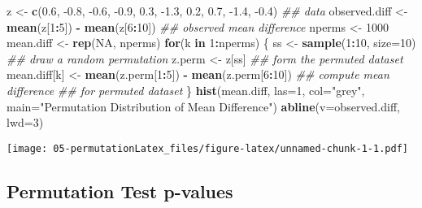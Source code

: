 \documentclass[]{book}
\newenvironment{Shaded}{\begin{snugshade}}{\end{snugshade}}
\newcommand{\CommentTok}[1]{\textcolor[rgb]{0.56,0.35,0.01}{\textit{#1}}}
\newcommand{\ControlFlowTok}[1]{\textcolor[rgb]{0.13,0.29,0.53}{\textbf{#1}}}
\newcommand{\DataTypeTok}[1]{\textcolor[rgb]{0.13,0.29,0.53}{#1}}
\newcommand{\DecValTok}[1]{\textcolor[rgb]{0.00,0.00,0.81}{#1}}
\newcommand{\FloatTok}[1]{\textcolor[rgb]{0.00,0.00,0.81}{#1}}
\newcommand{\KeywordTok}[1]{\textcolor[rgb]{0.13,0.29,0.53}{\textbf{#1}}}
\newcommand{\NormalTok}[1]{#1}
\newcommand{\OperatorTok}[1]{\textcolor[rgb]{0.81,0.36,0.00}{\textbf{#1}}}
\newcommand{\OtherTok}[1]{\textcolor[rgb]{0.56,0.35,0.01}{#1}}
\newcommand{\StringTok}[1]{\textcolor[rgb]{0.31,0.60,0.02}{#1}}
\begin{document}
\begin{Shaded}
\begin{Highlighting}[]
\NormalTok{z <-}\StringTok{ }\KeywordTok{c}\NormalTok{(}\FloatTok{0.6}\NormalTok{, }\FloatTok{-0.8}\NormalTok{, }\FloatTok{-0.6}\NormalTok{, }\FloatTok{-0.9}\NormalTok{, }\FloatTok{0.3}\NormalTok{, }\FloatTok{-1.3}\NormalTok{, }\FloatTok{0.2}\NormalTok{, }\FloatTok{0.7}\NormalTok{, }\FloatTok{-1.4}\NormalTok{, }\FloatTok{-0.4}\NormalTok{) }\CommentTok{## data}
\NormalTok{observed.diff <-}\StringTok{ }\KeywordTok{mean}\NormalTok{(z[}\DecValTok{1}\OperatorTok{:}\DecValTok{5}\NormalTok{]) }\OperatorTok{-}\StringTok{ }\KeywordTok{mean}\NormalTok{(z[}\DecValTok{6}\OperatorTok{:}\DecValTok{10}\NormalTok{])  }\CommentTok{## observed mean difference}
\NormalTok{nperms <-}\StringTok{ }\DecValTok{1000}
\NormalTok{mean.diff <-}\StringTok{ }\KeywordTok{rep}\NormalTok{(}\OtherTok{NA}\NormalTok{, nperms)}
\ControlFlowTok{for}\NormalTok{(k }\ControlFlowTok{in} \DecValTok{1}\OperatorTok{:}\NormalTok{nperms) \{}
\NormalTok{    ss <-}\StringTok{ }\KeywordTok{sample}\NormalTok{(}\DecValTok{1}\OperatorTok{:}\DecValTok{10}\NormalTok{, }\DataTypeTok{size=}\DecValTok{10}\NormalTok{)  }\CommentTok{## draw a random permutation}
\NormalTok{    z.perm <-}\StringTok{ }\NormalTok{z[ss]   }\CommentTok{## form the permuted dataset}
\NormalTok{    mean.diff[k] <-}\StringTok{ }\KeywordTok{mean}\NormalTok{(z.perm[}\DecValTok{1}\OperatorTok{:}\DecValTok{5}\NormalTok{]) }\OperatorTok{-}\StringTok{ }\KeywordTok{mean}\NormalTok{(z.perm[}\DecValTok{6}\OperatorTok{:}\DecValTok{10}\NormalTok{]) }\CommentTok{## compute mean difference}
                                                           \CommentTok{## for permuted dataset}
\NormalTok{\}}
\KeywordTok{hist}\NormalTok{(mean.diff, }\DataTypeTok{las=}\DecValTok{1}\NormalTok{, }\DataTypeTok{col=}\StringTok{"grey"}\NormalTok{, }\DataTypeTok{main=}\StringTok{"Permutation Distribution }
\StringTok{     of Mean Difference"}\NormalTok{)}
\KeywordTok{abline}\NormalTok{(}\DataTypeTok{v=}\NormalTok{observed.diff, }\DataTypeTok{lwd=}\DecValTok{3}\NormalTok{)}
\end{Highlighting}
\end{Shaded}

\texttt{[image: 05-permutationLatex\_files/figure-latex/unnamed-chunk-1-1.pdf]}

\hypertarget{permutation-test-p-values}{%
\subsection{Permutation Test p-values}\label{permutation-test-p-values}}
\end{document}
